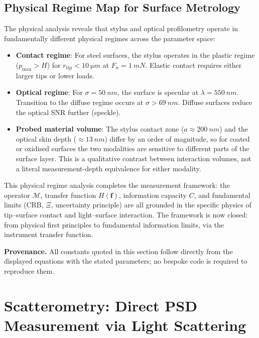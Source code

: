 \documentclass[review,12pt]{elsarticle}
\begin{document}
\subsection{Physical Regime Map for Surface Metrology}

The physical analysis reveals that stylus and optical profilometry operate in fundamentally different physical regimes across the parameter space:
\begin{itemize}
    \item \textbf{Contact regime}: For steel surfaces, the stylus operates in the plastic regime ($p_\mathrm{max} > H$) for $r_\mathrm{tip} < \SI{10}{\micro m}$ at $F_n = \SI{1}{mN}$. Elastic contact requires either larger tips or lower loads.
    \item \textbf{Optical regime}: For $\sigma = \SI{50}{nm}$, the surface is specular at $\lambda = \SI{550}{nm}$. Transition to the diffuse regime occurs at $\sigma > \SI{69}{nm}$. Diffuse surfaces reduce the optical SNR further (speckle).
    \item \textbf{Probed material volume}: The stylus contact zone ($a \approx \SI{200}{nm}$) and the optical skin depth ($\approx\SI{13}{nm}$) differ by an order of magnitude, so for coated or oxidised surfaces the two modalities are sensitive to different parts of the surface layer. This is a qualitative contrast between interaction volumes, not a literal measurement-depth equivalence for either modality.
\end{itemize}

This physical regime analysis completes the measurement framework: the operator $\mathcal{M}$, transfer function $H(\mathbf{f})$, information capacity $C$, and fundamental limits (CRB, $\Xi$, uncertainty principle) are all grounded in the specific physics of tip--surface contact and light--surface interaction. The framework is now closed: from physical first principles to fundamental information limits, via the instrument transfer function.

\textbf{Provenance.} All constants quoted in this section follow directly from the displayed equations with the stated parameters; no bespoke code is required to reproduce them.


\section{Scatterometry: Direct PSD Measurement via Light Scattering}
\end{document}

